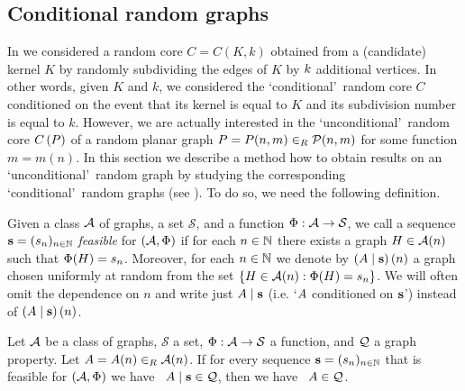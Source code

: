 \subsection{Conditional random graphs}\label{CBsub:conditional}
In  we considered a random core $C=C(K,k)$ obtained from a (candidate) kernel $K$ by randomly subdividing the edges of $K$ by $k$ additional vertices. In other words, given $K$ and $k$, we considered the \lq conditional\rq\ random core $C$ conditioned on the event that its kernel is equal to $K$ and its subdivision number is equal to $k$. However, we are actually interested in the \lq unconditional\rq\ random core $C\left(P\right)$ of a random planar graph $P = P(n,m)\in_R \mathcal{P}(n,m)$ for some function $m=m(n)$. In this section we describe a method how to obtain results on an \lq unconditional\rq\ random graph by studying the corresponding \lq conditional\rq\ random graphs (see ). To do so, we need the following definition.

\begin{definition}\label{CBdef:feasible}
Given a class $\mathcal{A}$ of graphs, a set $\mathcal{S}$, and a function $\Phi:\mathcal{A}\to \mathcal{S}$, we call a sequence $\mathbf{s}=(s_n)_{n\in \mathbb{N}}$ {\em feasible} for $\left(\mathcal{A}, \Phi\right)$ if for each $n \in \mathbb{N}$ there exists a graph $H \in \mathcal{A}(n)$ such that $\Phi(H)=s_n$. Moreover, for each $n\in \mathbb{N}$ we denote by $\left(A \mid \mathbf{s}\right)(n)$ a graph chosen uniformly at random from the set $\left\{H \in \mathcal{A}(n): \Phi(H)=s_n\right\}$. We will often omit the dependence on $n$ and write just $A \mid \mathbf{s}$ (i.e. \lq $A$ conditioned on $\mathbf{s}$\rq) instead of $\left(A \mid \mathbf{s}\right)(n)$.
\end{definition}
\begin{lem}\label{CBlem:splitting}
Let $\mathcal{A}$ be a class of graphs, $\mathcal{S}$ a set, $\Phi:\mathcal{A}\to \mathcal{S}$ a function, and $\mathcal{Q}$ a graph property. Let $A=A(n)\in_R \mathcal{A}(n)$. If for every sequence $\mathbf{s}=(s_n)_{n\in \mathbb{N}}$ that is feasible for $\left(\mathcal{A}, \Phi\right)$ we have \whp\ $A \mid \mathbf{s} \in \mathcal{Q}$, then we have \whp\ $A \in \mathcal{Q}$.
\end{lem}

